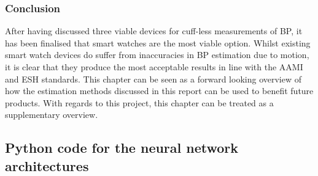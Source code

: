 \subsubsection*{Conclusion}
After having discussed three viable devices for cuff-less measurements of BP, it has been finalised that smart 
watches are the most viable option. Whilst existing smart watch devices do suffer from inaccuracies in BP estimation
 due to motion, it is clear that they produce the most acceptable results in line with the AAMI and ESH standards. This 
 chapter can be seen as a forward looking overview of how the estimation methods discussed in this report can be used to
  benefit future products. With regards to this project, this chapter can be treated as a supplementary overview.













\subsection*{Python code for the neural network architectures}
